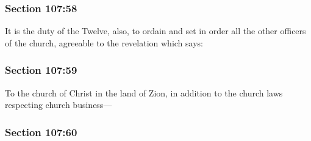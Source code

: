 
	\subsubsection{Section 107:58} %
		\label{DC107-58}

		It is the duty of the Twelve, also, to ordain and set in order all the other officers of the church, agreeable to the revelation which says:


	\subsubsection{Section 107:59} %
		\label{DC107-59}

		To the church of Christ in the land of Zion, in addition to the church laws respecting church business---


	\subsubsection{Section 107:60} %
		\label{DC107-60}

